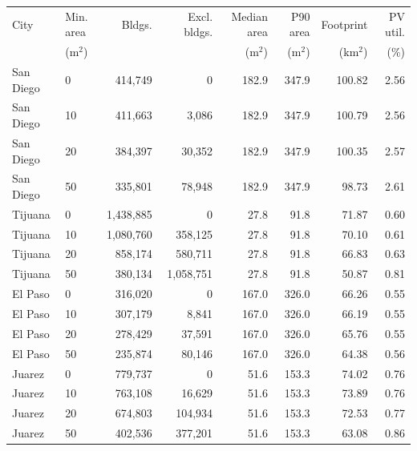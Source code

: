 \begin{tabular}{@{}llrrrrrr@{}}
\toprule
City & Min. area & Bldgs. & Excl. bldgs. & Median area & P90 area & Footprint & PV util. \\
 & (m$^2$) & & & (m$^2$) & (m$^2$) & (km$^2$) & (\%) \\
\midrule
San Diego & 0 & 414,749 & 0 & 182.9 & 347.9 & 100.82 & 2.56 \\
San Diego & 10 & 411,663 & 3,086 & 182.9 & 347.9 & 100.79 & 2.56 \\
San Diego & 20 & 384,397 & 30,352 & 182.9 & 347.9 & 100.35 & 2.57 \\
San Diego & 50 & 335,801 & 78,948 & 182.9 & 347.9 & 98.73 & 2.61 \\
Tijuana & 0 & 1,438,885 & 0 & 27.8 & 91.8 & 71.87 & 0.60 \\
Tijuana & 10 & 1,080,760 & 358,125 & 27.8 & 91.8 & 70.10 & 0.61 \\
Tijuana & 20 & 858,174 & 580,711 & 27.8 & 91.8 & 66.83 & 0.63 \\
Tijuana & 50 & 380,134 & 1,058,751 & 27.8 & 91.8 & 50.87 & 0.81 \\
El Paso & 0 & 316,020 & 0 & 167.0 & 326.0 & 66.26 & 0.55 \\
El Paso & 10 & 307,179 & 8,841 & 167.0 & 326.0 & 66.19 & 0.55 \\
El Paso & 20 & 278,429 & 37,591 & 167.0 & 326.0 & 65.76 & 0.55 \\
El Paso & 50 & 235,874 & 80,146 & 167.0 & 326.0 & 64.38 & 0.56 \\
Juarez & 0 & 779,737 & 0 & 51.6 & 153.3 & 74.02 & 0.76 \\
Juarez & 10 & 763,108 & 16,629 & 51.6 & 153.3 & 73.89 & 0.76 \\
Juarez & 20 & 674,803 & 104,934 & 51.6 & 153.3 & 72.53 & 0.77 \\
Juarez & 50 & 402,536 & 377,201 & 51.6 & 153.3 & 63.08 & 0.86 \\
\bottomrule
\end{tabular}
